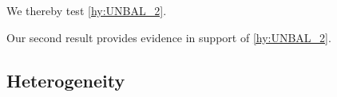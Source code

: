 \blindtext We thereby test \autoref{hy:UNBAL_2}.

\begin{result} \label{r:main2}
	\blindtext
\end{result}

Our second result provides evidence in support of \autoref{hy:UNBAL_2}.\blindmathfalse\blindtext\blindmathtrue

\subsection{Heterogeneity}
\blindmathpaper